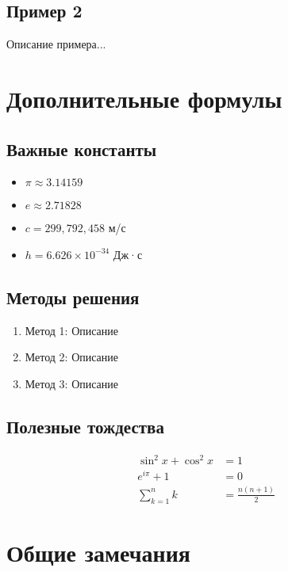 \documentclass[10pt,landscape,a4paper]{article}
\begin{document}
\subsection{Пример 2}
Описание примера...


\section{Дополнительные формулы}

\subsection{Важные константы}
\begin{itemize}
    \item $\pi \approx 3.14159$
    \item $e \approx 2.71828$
    \item $c = 299,792,458$ м/с
    \item $h = 6.626 \times 10^{-34}$ Дж·с
\end{itemize}

\subsection{Методы решения}
\begin{enumerate}
    \item Метод 1: Описание
    \item Метод 2: Описание
    \item Метод 3: Описание
\end{enumerate}

\subsection{Полезные тождества}
\begin{align}
    \sin^2 x + \cos^2 x &= 1 \\
    e^{i\pi} + 1 &= 0 \\
    \sum_{k=1}^n k &= \frac{n(n+1)}{2}
\end{align}

\section{Общие замечания}
\end{document}
